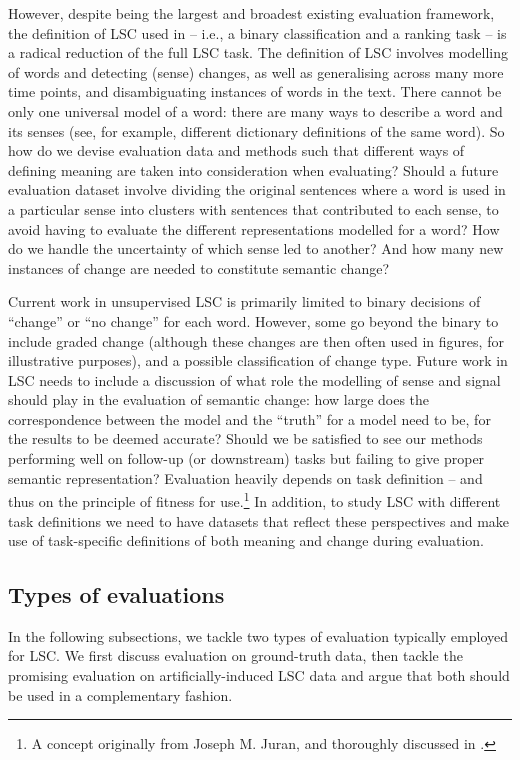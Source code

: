 \documentclass[output=paper]{langscibook}
\begin{document}
However, despite being the largest and broadest existing evaluation framework, the definition of LSC used in \citet{schlechtweg-etal-2020-semeval} -- i.e., a binary classification and a ranking task -- is a radical reduction of the full LSC task. The definition of LSC involves  modelling of words and detecting (sense) changes, as well as generalising across many more time points, and disambiguating instances of words in the text.
%
There cannot be only one universal model of a word: there are many ways to describe a word and its senses (see, for example, different dictionary definitions of the same word). So how do we devise evaluation data and methods such that different ways of defining meaning are taken into consideration when evaluating? Should a future evaluation dataset involve dividing the original sentences where a word is used in a particular sense into clusters with sentences that contributed to each sense, to avoid having to evaluate the different representations modelled for a word? How do we handle the uncertainty of which sense led to another? And how many new instances of change are needed to constitute semantic change? 

Current work in unsupervised LSC is primarily limited to binary decisions of ``change'' or ``no change'' for each word. However, some go beyond the binary to include graded change (although these changes are then often used in figures, for illustrative purposes), and a possible classification of change type. Future work in LSC needs to include a discussion of what role the modelling of sense and signal should play in the evaluation of semantic change: how large does the correspondence between the model and the ``truth'' for a model need to be, for the results to be deemed accurate? 
Should we be satisfied to see our methods performing well on follow-up (or downstream) tasks but failing to give proper semantic representation? 
Evaluation heavily depends on task definition -- and thus on the principle of fitness for use.\footnote{A concept originally from Joseph M. Juran, and thoroughly discussed in \citet{boydens1999informatique}.} In addition, to study LSC with different task definitions we need to have datasets that reflect these perspectives and make use of task-specific definitions of both meaning and change during evaluation.  

\subsection{Types of evaluations}
In the following subsections, we tackle two types of evaluation typically employed for LSC. We first discuss evaluation on ground-truth data, then tackle the promising evaluation on artificially-induced LSC data and argue that both should be used in a complementary fashion.
\end{document}
